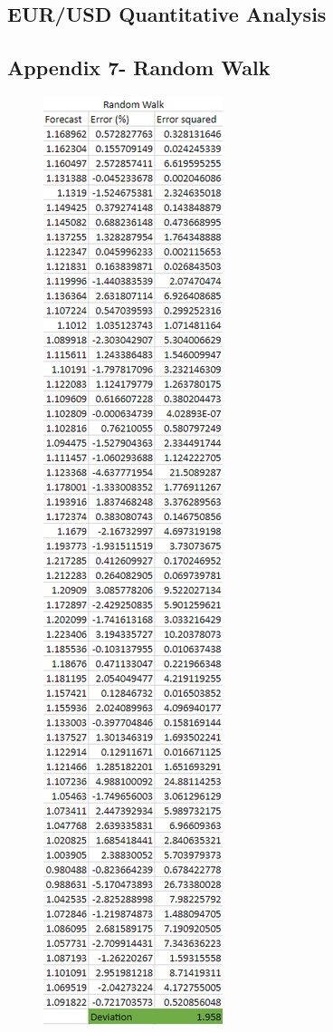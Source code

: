 \documentclass{article}
\let\Oldsubsection\subsection
\renewcommand{\subsection}{\FloatBarrier\Oldsubsection}
\begin{document}
\subsection*{EUR/USD Quantitative Analysis}

\subsection*{Appendix 7- Random Walk}


\begin{figure}[h!]
    \centering
    \includegraphics[scale=0.5]{graphs/app7.png}
\end{figure}
\end{document}
